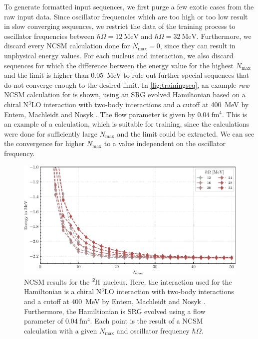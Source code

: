 To generate formatted input sequences, we first purge a few exotic cases from the raw input data. Since oscillator frequencies which are too high or too low result in slow converging sequences, we restrict the data of the training process to oscillator frequencies between $\hbar\Omega=\SI{12}{\mega\electronvolt}$ and $\hbar\Omega=\SI{32}{\mega\electronvolt}$. Furthermore, we discard every NCSM calculation done for $N_\mathrm{max} = 0$, since they can result in unphysical energy values. For each nucleus and interaction, we also discard sequences for which the difference between the energy value for the highest $N_\mathrm{max}$ and the limit is higher than \SI{0.05}{\mega\electronvolt} to rule out further special sequences that do not converge enough to the desired limit.
In \autoref{fig:trainingseq}, an example \textit{raw} NCSM calculation for  is shown, using an SRG evolved Hamiltonian based on a chiral N$^{3}$LO interaction with two-body interactions and a cutoff at \SI{400}{\mega\electronvolt} by Entem, Machleidt and Nosyk \cite{entemmachleidt}. The flow parameter is given by $\SI{0.04}{\femto\metre^4}$. This is an example of a calculation, which is suitable for training, since the calculations were done for sufficiently large $N_\mathrm{max}$ and the limit could be extracted. We can see the convergence for higher $N_\mathrm{max}$ to a value independent on the oscillator frequency.

\begin{figure}[H]
  \centering
  \includegraphics{media/example_sequence.pdf}
  \caption{NCSM results for the $\n{2}{H}$ nucleus. Here, the interaction used for the Hamiltonian is a chiral N$^{3}$LO interaction with two-body interactions and a cutoff at \SI{400}{\mega\electronvolt} by Entem, Machleidt and Nosyk \cite{entemmachleidt}. Furthermore, the Hamiltionian is SRG evolved using a flow parameter of $\SI{0.04}{\femto\metre^4}$. Each point is the result of a NCSM calculation with a given $N_\mathrm{max}$ and oscillator frequency $\hbar \Omega$.}
  \label{fig:trainingseq}
\end{figure}

